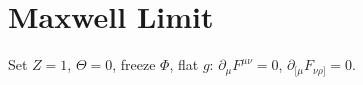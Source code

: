 \section*{Maxwell Limit} Set $Z\!=\!1$, $\Theta\!=\!0$, freeze $\Phi$, flat $g$: $\partial_\mu F^{\mu\nu}=0$, $\partial_{[\mu}F_{\nu\rho]}=0$.
